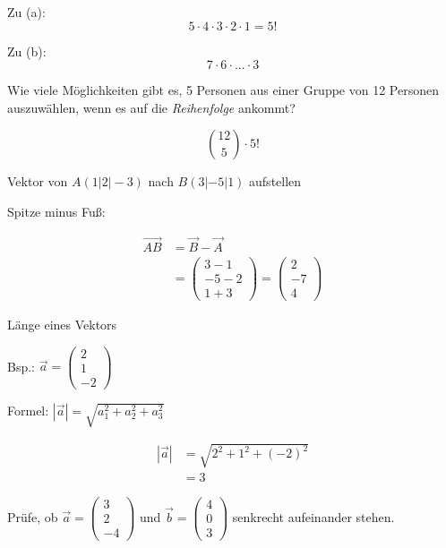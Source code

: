 \documentclass[paper=a6,ngerman,twoside=true,fontsize=14pt, parskip = half]{scrartcl}
\begin{document}
\begin{antwort}
	Zu (a):
		\[5 \cdot 4 \cdot 3\cdot 2 \cdot 1=5!\]
	
	Zu (b):
		\[7 \cdot 6 \cdot  ... \cdot 3\]
\end{antwort}	
\begin{frage}
	Wie viele Möglichkeiten gibt es, 5 Personen aus einer Gruppe von 12 Personen auszuwählen, wenn
	es auf die \emph{Reihenfolge} ankommt?
\end{frage}
\begin{antwort}
	\[\binom{12}{5} \cdot 5!\]
\end{antwort}	
\begin{frage}
	Vektor von $A(1|2|-3)$ nach $B(3|-5|1)$ aufstellen
\end{frage}
\begin{antwort}
	Spitze minus Fuß:
	
	\bigskip		
	\begin{align*}
		\vec{AB}&=\vec{B}-\vec{A} \\
		&=\left(\begin{array}{c} 3-1 \\ -5-2 \\ 1+3\end{array} \right)=\left(\begin{array}{c} 2 \\ -7 \\ 4\end{array} \right)
	\end{align*}	
\end{antwort}		
\begin{frage}
	Länge eines Vektors
	
	Bsp.: $\vec{a}=\left(\begin{array}{c} 2 \\ 1 \\ -2\end{array} \right)$
\end{frage}
\begin{antwort}
	Formel: $\left|\vec{a}\right|=\sqrt{a_1^2 + a_2^2 + a_3^2}$
	
	\bigskip		
	\begin{align*}
	\left|\vec{a}\right|&=\sqrt{2^2 + 1^2 + (-2)^2} \\
	&=3
	\end{align*}
	
\end{antwort}	
\begin{frage}
	Prüfe, ob $\vec{a}=\left(\begin{array}{c} 3 \\ 2 \\ -4\end{array} \right)$ und  $\vec{b}=\left(\begin{array}{c} 4 \\ 0 \\ 3\end{array} \right)$ 
	senkrecht aufeinander stehen.
\end{frage}
\end{document}
